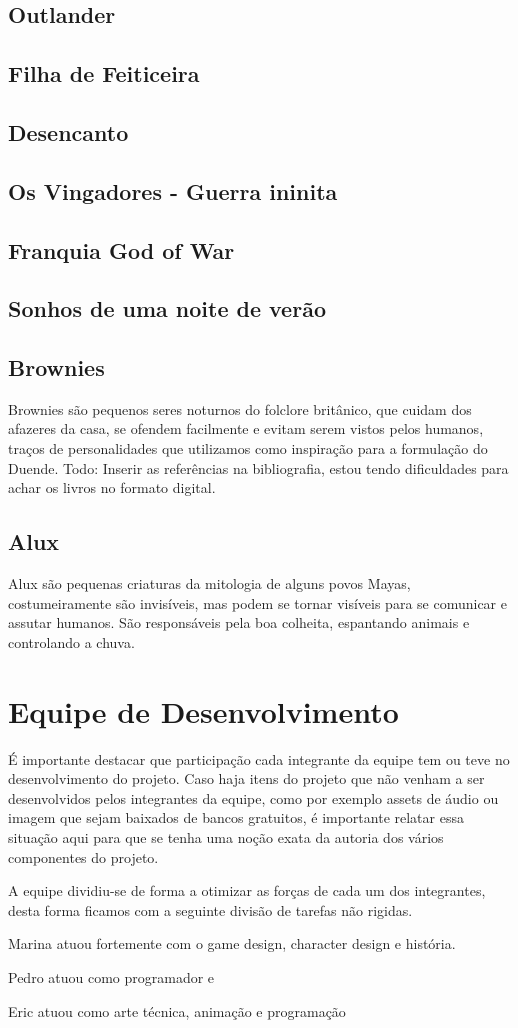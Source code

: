 \subsection{Outlander}
\subsection{Filha de Feiticeira}
\subsection{Desencanto}
\subsection{Os Vingadores - Guerra ininita}
\subsection{Franquia God of War}
\subsection{Sonhos de uma noite de verão}
\subsection{Brownies}
Brownies são pequenos seres noturnos do folclore britânico, que cuidam dos afazeres da casa, se ofendem facilmente e evitam serem vistos pelos humanos, traços de personalidades que utilizamos como inspiração para a formulação do Duende.
Todo: Inserir as referências na bibliografia, estou tendo dificuldades para achar os livros no formato digital.

\subsection{Alux}
Alux são pequenas criaturas da mitologia de alguns povos Mayas, costumeiramente são invisíveis, mas podem se tornar visíveis para se comunicar e assutar humanos.  São responsáveis pela boa colheita, espantando animais e controlando a chuva. 

\section{Equipe de Desenvolvimento}
É importante destacar que participação cada integrante da equipe tem ou teve no desenvolvimento do projeto.
Caso haja itens do projeto que não venham a ser desenvolvidos pelos integrantes da equipe, como por exemplo assets de áudio ou imagem que sejam baixados de bancos gratuitos, é importante relatar essa situação aqui para que se tenha uma noção exata da autoria dos vários componentes do projeto.

A equipe dividiu-se de forma a otimizar as forças de cada um dos integrantes, desta forma ficamos com a seguinte divisão de tarefas não rigidas. 

Marina atuou fortemente com o game design, character design e história. 

Pedro atuou como programador e 

Eric atuou como arte técnica, animação e programação